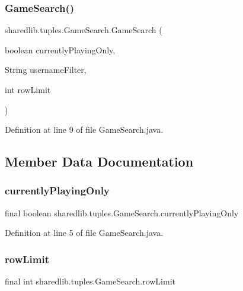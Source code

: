 \subsubsection{\texorpdfstring{Game\+Search()}{GameSearch()}}
{\footnotesize\ttfamily sharedlib.\+tuples.\+Game\+Search.\+Game\+Search (\begin{DoxyParamCaption}\item[{boolean}]{currently\+Playing\+Only,  }\item[{String}]{username\+Filter,  }\item[{int}]{row\+Limit }\end{DoxyParamCaption})}



Definition at line 9 of file Game\+Search.\+java.



\subsection{Member Data Documentation}
\hypertarget{classsharedlib_1_1tuples_1_1_game_search_a88c70bcff0388dd9e9704a60980049b8}{}\label{classsharedlib_1_1tuples_1_1_game_search_a88c70bcff0388dd9e9704a60980049b8} 
\subsubsection{\texorpdfstring{currently\+Playing\+Only}{currentlyPlayingOnly}}
{\footnotesize\ttfamily final boolean sharedlib.\+tuples.\+Game\+Search.\+currently\+Playing\+Only}



Definition at line 5 of file Game\+Search.\+java.

\hypertarget{classsharedlib_1_1tuples_1_1_game_search_a4904f3bb0a4b76505839c5f769746b37}{}\label{classsharedlib_1_1tuples_1_1_game_search_a4904f3bb0a4b76505839c5f769746b37} 
\subsubsection{\texorpdfstring{row\+Limit}{rowLimit}}
{\footnotesize\ttfamily final int sharedlib.\+tuples.\+Game\+Search.\+row\+Limit}




